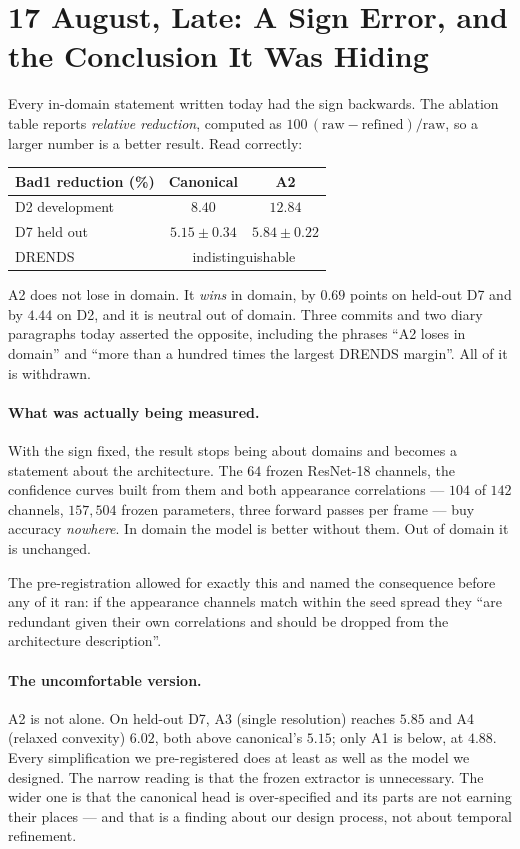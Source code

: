 \documentclass[11pt,a4paper]{article}
\begin{document}
\section*{17 August, Late: A Sign Error, and the Conclusion It Was
Hiding}

Every in-domain statement written today had the sign backwards. The
ablation table reports \emph{relative reduction}, computed as
$100\,(\text{raw}-\text{refined})/\text{raw}$, so a larger number is a
better result. Read correctly:

\begin{center}
\begin{tabular}{lcc}
\toprule
Bad1 reduction (\%) & Canonical & A2 \\
\midrule
D2 development & $8.40$ & $\mathbf{12.84}$ \\
D7 held out    & $5.15 \pm 0.34$ & $\mathbf{5.84 \pm 0.22}$ \\
DRENDS         & \multicolumn{2}{c}{indistinguishable} \\
\bottomrule
\end{tabular}
\end{center}

A2 does not lose in domain. It \emph{wins} in domain, by $0.69$ points on
held-out D7 and by $4.44$ on D2, and it is neutral out of domain. Three
commits and two diary paragraphs today asserted the opposite, including
the phrases ``A2 loses in domain'' and ``more than a hundred times the
largest DRENDS margin''. All of it is withdrawn.

\paragraph{What was actually being measured.} With the sign fixed, the
result stops being about domains and becomes a statement about the
architecture. The $64$ frozen ResNet-18 channels, the confidence curves
built from them and both appearance correlations --- $104$ of $142$
channels, $157{,}504$ frozen parameters, three forward passes per frame
--- buy accuracy \emph{nowhere}. In domain the model is better without
them. Out of domain it is unchanged.

The pre-registration allowed for exactly this and named the consequence
before any of it ran: if the appearance channels match within the seed
spread they ``are redundant given their own correlations and should be
dropped from the architecture description''.

\paragraph{The uncomfortable version.} A2 is not alone. On held-out D7,
A3 (single resolution) reaches $5.85$ and A4 (relaxed convexity) $6.02$,
both above canonical's $5.15$; only A1 is below, at $4.88$. Every
simplification we pre-registered does at least as well as the model we
designed. The narrow reading is that the frozen extractor is unnecessary.
The wider one is that the canonical head is over-specified and its parts
are not earning their places --- and that is a finding about our design
process, not about temporal refinement.
\end{document}
